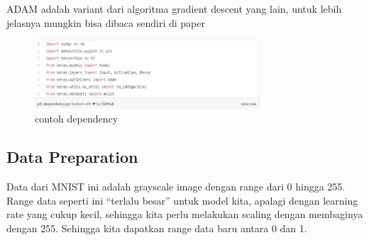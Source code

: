 ADAM adalah variant dari algoritma gradient descent yang lain, untuk lebih jelasnya mungkin bisa dibaca sendiri di paper 
\begin{figure}[!htp]
	\includegraphics[width=0.75\textwidth]{figures/Dependency.JPG}
	\caption{contoh dependency}
	\label{labelgambar}
\end{figure}

\subsection{Data Preparation}
Data dari MNIST ini adalah grayscale image dengan range dari 0 hingga 255. Range data seperti ini “terlalu besar” untuk model kita, apalagi dengan learning rate yang cukup kecil, sehingga kita perlu melakukan scaling dengan membaginya dengan 255. Sehingga kita dapatkan range data baru antara 0 dan 1.




